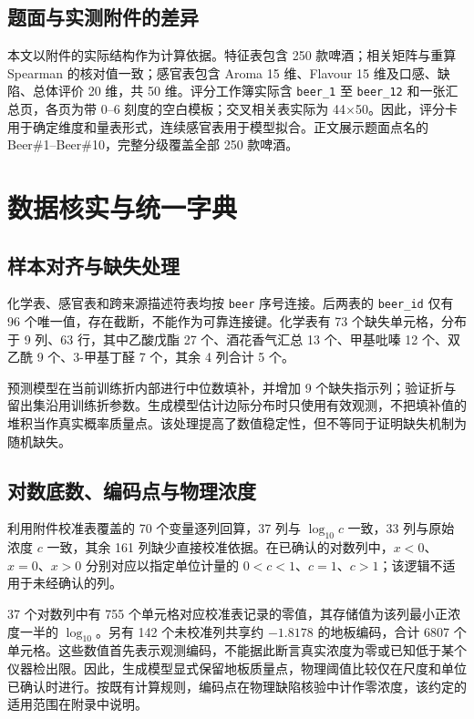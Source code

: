 \documentclass[
  chinese,
  11pt,
]{article}
\begin{document}
\subsection{题面与实测附件的差异}\label{ux9898ux9762ux4e0eux5b9eux6d4bux9644ux4ef6ux7684ux5deeux5f02}

本文以附件的实际结构作为计算依据。特征表包含 250 款啤酒；相关矩阵与重算
Spearman 的核对值一致；感官表包含 Aroma 15 维、Flavour 15
维及口感、缺陷、总体评价 20 维，共 50 维。评分工作簿实际含
\texttt{beer\_1} 至 \texttt{beer\_12} 和一张汇总页，各页为带 0--6
刻度的空白模板；交叉相关表实际为
44×50。因此，评分卡用于确定维度和量表形式，连续感官表用于模型拟合。正文展示题面点名的
Beer\#1--Beer\#10，完整分级覆盖全部 250 款啤酒。

\section{数据核实与统一字典}\label{ux6570ux636eux6838ux5b9eux4e0eux7edfux4e00ux5b57ux5178}

\subsection{样本对齐与缺失处理}\label{ux6837ux672cux5bf9ux9f50ux4e0eux7f3aux5931ux5904ux7406}

化学表、感官表和跨来源描述符表均按 \texttt{beer} 序号连接。后两表的
\texttt{beer\_id} 仅有 96
个唯一值，存在截断，不能作为可靠连接键。化学表有 73 个缺失单元格，分布于
9 列、63 行，其中乙酸戊酯 27 个、酒花香气汇总 13 个、甲基吡嗪 12
个、双乙酰 9 个、3-甲基丁醛 7 个，其余 4 列合计 5 个。

预测模型在当前训练折内部进行中位数填补，并增加 9
个缺失指示列；验证折与留出集沿用训练折参数。生成模型估计边际分布时只使用有效观测，不把填补值的堆积当作真实概率质量点。该处理提高了数值稳定性，但不等同于证明缺失机制为随机缺失。

\subsection{对数底数、编码点与物理浓度}\label{ux5bf9ux6570ux5e95ux6570ux7f16ux7801ux70b9ux4e0eux7269ux7406ux6d53ux5ea6}

利用附件校准表覆盖的 70 个变量逐列回算，37 列与 \(\log_{10}c\) 一致，33
列与原始浓度 \(c\) 一致，其余 161
列缺少直接校准依据。在已确认的对数列中，\(x<0\)、\(x=0\)、\(x>0\)
分别对应以指定单位计量的
\(0<c<1\)、\(c=1\)、\(c>1\)；该逻辑不适用于未经确认的列。

37 个对数列中有 755
个单元格对应校准表记录的零值，其存储值为该列最小正浓度一半的
\(\log_{10}\)。另有 142 个未校准列共享约 \(-1.8178\) 的地板编码，合计
6807
个单元格。这些数值首先表示观测编码，不能据此断言真实浓度为零或已知低于某个仪器检出限。因此，生成模型显式保留地板质量点，物理阈值比较仅在尺度和单位已确认时进行。按既有计算规则，编码点在物理缺陷核验中计作零浓度，该约定的适用范围在附录中说明。
\end{document}
